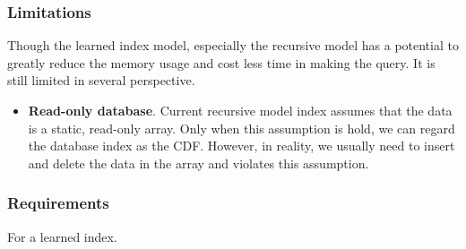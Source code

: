 \subsubsection{Limitations}

Though the learned index model, especially the recursive model has a potential to greatly reduce the memory usage and cost less time in making the query. It is still limited in several perspective.

\begin{itemize}
    \item \textbf{Read-only database}. Current recursive model index assumes that the data is a static, read-only array. Only when this assumption is hold, we can regard the database index as the CDF. However, in reality, we usually need to insert and delete the data in the array and violates this assumption.
\end{itemize}

\subsubsection{Requirements}

For a learned index.